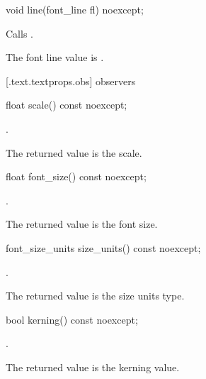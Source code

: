 %
\begin{itemdecl}
void line(font_line fl) noexcept;
\end{itemdecl}
\begin{itemdescr}
\pnum
\effects Calls .

\pnum
\remarks The font line value is .
\end{itemdescr}

 [\iotwod.text.textprops.obs] { observers}

%
\begin{itemdecl}
float scale() const noexcept;
\end{itemdecl}
\begin{itemdescr}
\pnum
\returns {}.

\pnum
\remarks
The returned value is the scale.
\end{itemdescr}

%
\begin{itemdecl}
float font_size() const noexcept;
\end{itemdecl}
\begin{itemdescr}
\pnum
\returns {}.

\pnum
\remarks
The returned value is the font size.
\end{itemdescr}

%
\begin{itemdecl}
font_size_units size_units() const noexcept;
\end{itemdecl}
\begin{itemdescr}
\pnum
\returns {}.

\pnum
\remarks
The returned value is the size units type.
\end{itemdescr}

%
\begin{itemdecl}
bool kerning() const noexcept;
\end{itemdecl}
\begin{itemdescr}
\pnum
\returns {}.

\pnum
\remarks
The returned value is the kerning value.
\end{itemdescr}

